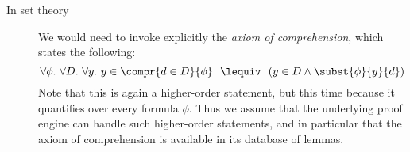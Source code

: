 \begin{description}
  \item[In  set theory]
    We would need to invoke explicitly the \emph{axiom of comprehension}, which
    states the following:
    $$\forall \phi.\ \forall D.\ \forall y.\ y \in \compr{d \in D}{\phi} ~~\lequiv~~ (y \in D \land \subst{\phi}{y}{d})$$
    Note that this is again a higher-order statement, but this time because it
    quantifies over every formula $\phi$. Thus we assume that the underlying
    proof engine can handle such higher-order statements, and in particular that
    the axiom of comprehension is available in its database of lemmas.
    

\end{description}
